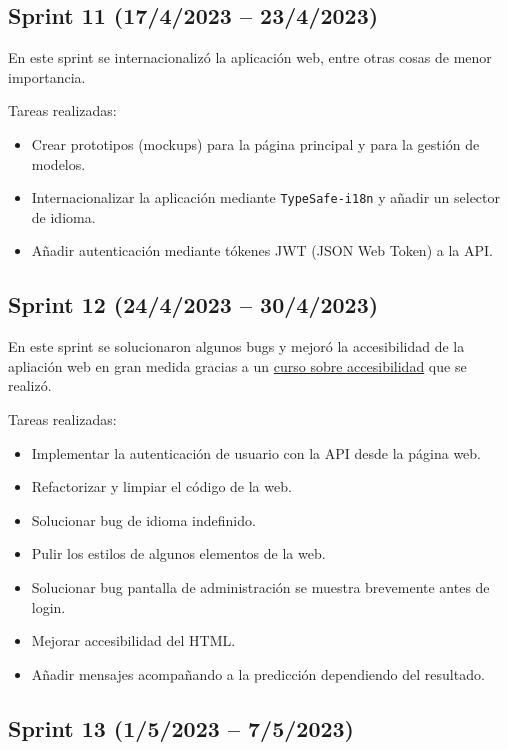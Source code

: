 \subsection{Sprint 11 (17/4/2023 -- 23/4/2023)}

En este sprint se internacionalizó la aplicación web, entre otras cosas de menor
importancia.

Tareas realizadas:

\begin{itemize}
    \item Crear prototipos (mockups) para la página principal y para la gestión
    de modelos.
    \item Internacionalizar la aplicación mediante \texttt{TypeSafe-i18n} y
    añadir un selector de idioma.
    \item Añadir autenticación mediante tókenes JWT (JSON Web Token) a la API.
\end{itemize}

\subsection{Sprint 12 (24/4/2023 -- 30/4/2023)}

En este sprint se solucionaron algunos bugs y mejoró la accesibilidad de la
apliación web en gran medida gracias a un
\href{https://www.udacity.com/course/web-accessibility--ud891}{curso sobre
accesibilidad} que se realizó.

Tareas realizadas:

\begin{itemize}
    \item Implementar la autenticación de usuario con la API desde la página web.
    \item Refactorizar y limpiar el código de la web.
    \item Solucionar bug de idioma indefinido.
    \item Pulir los estilos de algunos elementos de la web.
    \item Solucionar bug pantalla de administración se muestra brevemente antes
    de login.
    \item Mejorar accesibilidad del HTML.
    \item Añadir mensajes acompañando a la predicción dependiendo del resultado.
\end{itemize}

\subsection{Sprint 13 (1/5/2023 -- 7/5/2023)}

